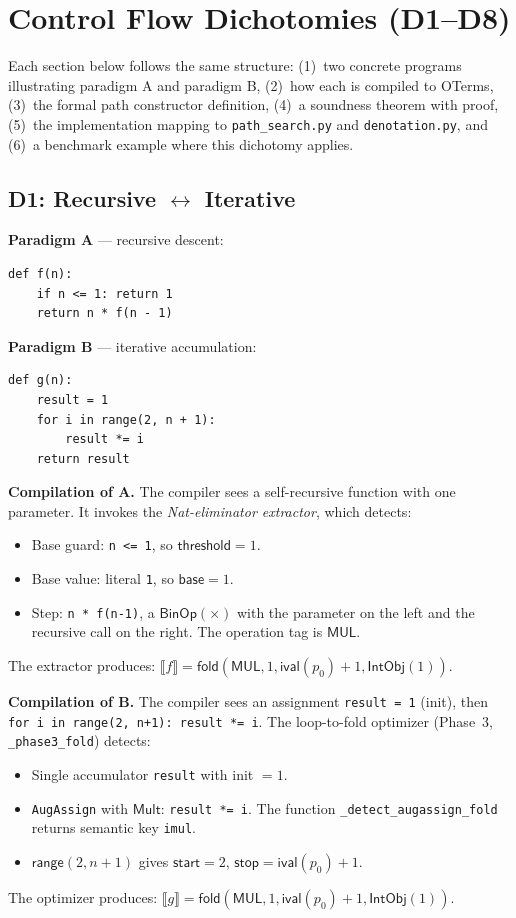 \documentclass[11pt,a4paper]{report}
\theoremstyle{definition}
\theoremstyle{plain}
\newcommand{\den}[1]{\llbracket #1 \rrbracket}
\newcommand{\fold}{\mathsf{fold}}
\begin{document}
\chapter{Control Flow Dichotomies (D1--D8)}
\label{ch:cf-dichotomies}

Each section below follows the same structure: (1)~two concrete programs
illustrating paradigm A and paradigm B, (2)~how each is compiled to
OTerms, (3)~the formal path constructor definition, (4)~a soundness
theorem with proof, (5)~the implementation mapping to
\texttt{path\_search.py} and \texttt{denotation.py}, and (6)~a benchmark
example where this dichotomy applies.

\section{D1: Recursive $\leftrightarrow$ Iterative}
\label{sec:d1}

\textbf{Paradigm A} --- recursive descent:
\begin{lstlisting}
def f(n):
    if n <= 1: return 1
    return n * f(n - 1)
\end{lstlisting}

\textbf{Paradigm B} --- iterative accumulation:
\begin{lstlisting}
def g(n):
    result = 1
    for i in range(2, n + 1):
        result *= i
    return result
\end{lstlisting}

\textbf{Compilation of A.}
The compiler sees a self-recursive function with one parameter.  It
invokes the \emph{Nat-eliminator extractor}, which detects:
\begin{itemize}
  \item Base guard: \texttt{n <= 1}, so $\mathsf{threshold} = 1$.
  \item Base value: literal \texttt{1}, so $\mathsf{base} = 1$.
  \item Step: \texttt{n * f(n-1)}, a $\mathsf{BinOp}(\times)$ with
    the parameter on the left and the recursive call on the right.
    The operation tag is $\mathsf{MUL}$.
\end{itemize}
The extractor produces: $\den{f} = \fold(\mathsf{MUL}, 1,
\mathsf{ival}(p_0) + 1, \mathsf{IntObj}(1))$.

\textbf{Compilation of B.}
The compiler sees an assignment \texttt{result = 1} (init), then
\texttt{for i in range(2, n+1): result *= i}.  The loop-to-fold
optimizer (Phase~3, \texttt{\_phase3\_fold}) detects:
\begin{itemize}
  \item Single accumulator \texttt{result} with init $= 1$.
  \item \texttt{AugAssign} with $\mathsf{Mult}$: \texttt{result *= i}.
    The function \texttt{\_detect\_augassign\_fold} returns semantic
    key \texttt{imul}.
  \item $\mathsf{range}(2, n+1)$ gives $\mathsf{start} = 2$,
    $\mathsf{stop} = \mathsf{ival}(p_0) + 1$.
\end{itemize}
The optimizer produces: $\den{g} = \fold(\mathsf{MUL}, 1,
\mathsf{ival}(p_0) + 1, \mathsf{IntObj}(1))$.
\end{document}

